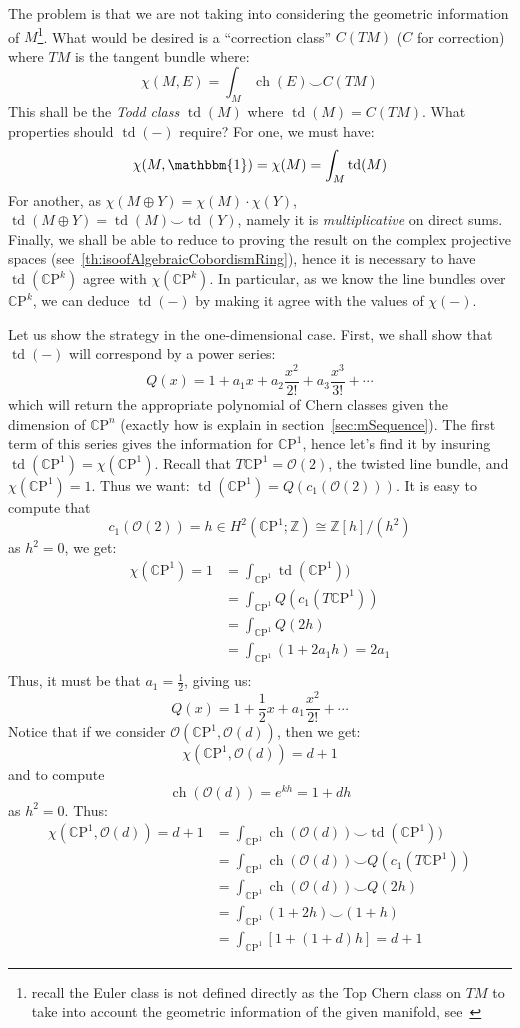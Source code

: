 \documentclass{ut-thesis}
\newcommand{\Z}{{\mathbb{Z}}}
\newcommand{\CO}{{\mathcal{O}}}
\newcommand{\CP}{{\mathbb{C}\mathrm{P}}}
\newcommand{\ch}{{\operatorname{ch}}}
\newcommand{\td}{{\operatorname{td}}}
\renewcommand{\ch}{{\operatorname{ch}}}
\begin{document}
The problem is that we are not taking into considering the geometric information of $M$\footnote{recall the
Euler class is not defined directly as the Top Chern class on  $TM$ to take into account the geometric
information of the given manifold, see~\cite{NateKTheory}}. What would be desired
is a ``correction class'' $C(TM)$ ($C$ for correction) where $TM$ is the tangent bundle where:
\[
  \chi(M, E) = \int_M \ch(E) \smile C(TM)
\]
This shall be the \emph{Todd class} $\td(M)$ where $\td(M) = C(TM)$. What properties should $\td(-)$ require? For one, we must have:
\[
  \chi(M, \mathbbm{1}) = \chi(M) = \int_M \td(M)
\]
For another, as $\chi(M\oplus Y) = \chi(M)\cdot \chi(Y)$, $\td(M\oplus Y) = \td(M)\smile \td(Y)$, namely it is
\emph{multiplicative} on direct sums. Finally, we shall be able to reduce to proving the result on the complex
projective spaces (see~\cref{th:isoofAlgebraicCobordismRing}), hence
it is necessary to have $\td(\CP^k)$ agree with $\chi(\CP^k)$. In particular, as we know the line bundles over
$\CP^k$, we can deduce $\td(-)$ by making it agree with the values of $\chi(-)$.

Let us show the strategy in the one-dimensional case. First, we shall show that
$\td(-)$ will correspond by a power series:
\[
  Q(x) = 1 + a_1x + a_2\frac{x^2}{2!} + a_3 \frac{x^3}{3!} +  \cdots
\]
which will return the appropriate polynomial of Chern classes given the dimension of $\CP^n$ (exactly how is explain
in section~\ref{sec:mSequence}). The first term of this series gives the information for $\CP^1$, hence let's
find it by insuring $\td(\CP^1) = \chi(\CP^1)$. Recall that $T\CP^1 = \CO(2)$, the twisted line bundle, and
$\chi(\CP^1) = 1$. Thus we want: $\td(\CP^1) = Q\left(c_1(\CO(2))\right)$. It is easy to compute that
\[
  c_1(\CO(2)) = h \in H^2(\CP^1; \Z) \cong \Z[h]/(h^2)
\]
as $h^2 = 0$, we get:
\begin{align*}
  \chi(\CP^1) = 1 &= \int_{\CP^1} \td(\CP^1))\\
  &= \int_{\CP^1} Q(c_1(T\CP^1))\\
  &= \int_{\CP^1} Q(2h)\\
  &= \int_{\CP^1} (1 + 2a_1h) = 2a_1\\
\end{align*}
Thus, it must be that $a_1 = \frac{1}{2}$, giving us:
\[
  Q(x) = 1 + \frac{1}{2}x + a_1 \frac{x^2}{2!} + \cdots
\]
Notice that if we consider $\CO(\CP^1, \CO(d))$, then we get:
\[
  \chi(\CP^1, \CO(d)) = d+1
\]
and to compute
\[
  \ch(\CO(d)) = e^{kh} = 1 + dh
\]
as $h^2 = 0$. Thus:
\begin{align*}
  \chi(\CP^1, \CO(d)) = d+1 &= \int_{\CP^1} \ch(\CO(d)) \smile \td(\CP^1))\\
  &= \int_{\CP^1} \ch(\CO(d)) \smile Q(c_1(T\CP^1))\\
  &= \int_{\CP^1} \ch(\CO(d)) \smile Q(2h)\\
  &= \int_{\CP^1} (1+2h) \smile (1 + h)\\
  &= \int_{\CP^1} [1 + (1 + d)h] = d+1
\end{align*}
\end{document}
